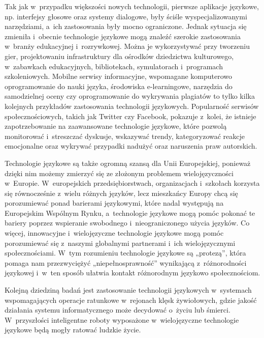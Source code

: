 \begin{multicols}{2}

Tak jak w~przypadku większości nowych technologii, pierwsze
aplikacje językowe, np. interfejsy głosowe oraz systemy dialogowe,
były ściśle wyspecjalizowanymi narzędziami, a~ich zastosowania
były mocno ograniczone. Jednak sytuacja się zmieniła i~obecnie
technologie językowe mogą znaleźć szerokie zastosowania w~branży
edukacyjnej i~rozrywkowej. Można je wykorzystywać przy tworzeniu
gier, projektowaniu infrastruktury dla ośrodków dziedzictwa
kulturowego, w~zabawkach edukacyjnych, bibliotekach, symulatorach
i~programach szkoleniowych. Mobilne serwisy informacyjne, wspomagane
komputerowo oprogramowanie do nauki języka, środowiska
e-learningowe, narzędzia do samodzielnej oceny czy oprogramowanie do
wykrywania plagiatów to tylko kilka kolejnych przykładów
zastosowania technologii językowych. Popularność serwisów
społecznościowych, takich jak Twitter czy Facebook, pokazuje
z~kolei, że istnieje zapotrzebowanie na zaawansowane technologie
językowe, które pozwolą monitorować i~streszczać dyskusje,
wskazywać trendy, kategoryzować reakcje emocjonalne oraz wykrywać
przypadki nadużyć oraz naruszenia praw autorskich. 

Technologie językowe są także ogromną szansą dla Unii
Europejskiej, ponieważ dzięki nim możemy zmierzyć się ze
złożonym problemem wielojęzyczności w~Europie. W~europejskich
przedsiębiorstwach, organizacjach i~szkołach korzysta się
równocześnie z~wielu różnych języków, lecz mieszkańcy Europy
chcą się porozumiewać ponad barierami językowymi, które nadal
występują na Europejskim Wspólnym Rynku, a~technologie językowe
mogą pomóc pokonać te bariery poprzez wspieranie swobodnego
i~nieograniczonego użycia języków. Co więcej, innowacyjne
i~wielojęzyczne technologie językowe mogą pomóc porozumiewać się
z~naszymi globalnymi partnerami i~ich wielojęzycznymi
społecznościami. W~tym rozumieniu technologie językowe są
„protezą”, która pomaga nam przezwyciężyć
„niepełnosprawność” wynikającą z~różnorodności językowej
i~w~ten sposób ułatwia kontakt różnorodnym językowo
społecznościom. 

Kolejną dziedziną badań jest zastosowanie technologii językowych
w~systemach wspomagających operacje ratunkowe w~rejonach klęsk
żywiołowych, gdzie jakość działania systemu informatycznego może
decydować o~życiu lub śmierci. W~przyszłości inteligentne roboty
wyposażone w~wielojęzyczne technologie językowe będą mogły
ratować ludzkie życie. 


\end{multicols}
